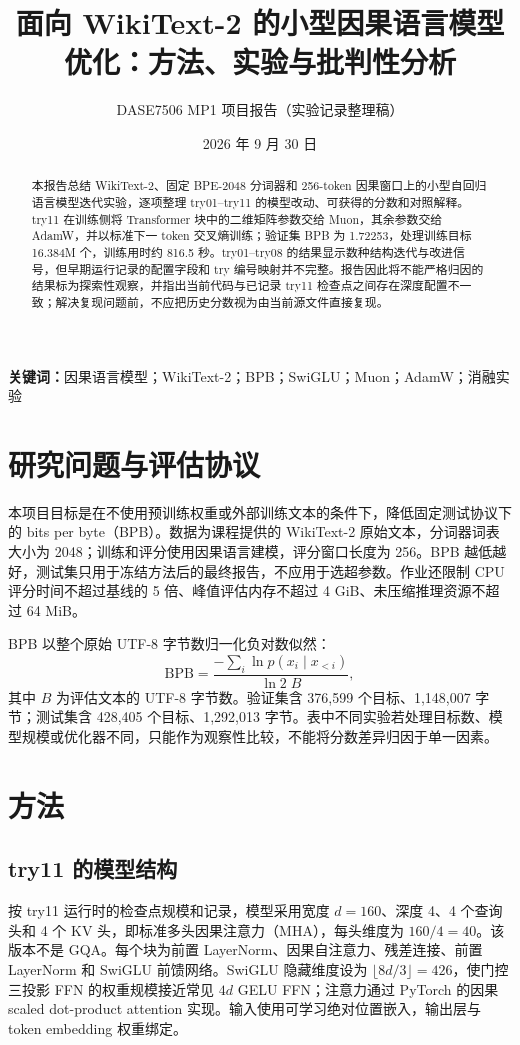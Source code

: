 \documentclass[UTF8,a4paper,11pt]{ctexart}
\title{面向 WikiText-2 的小型因果语言模型优化：方法、实验与批判性分析}
\author{DASE7506 MP1 项目报告（实验记录整理稿）}
\date{2026 年 9 月 30 日}
\begin{document}
\maketitle

\begin{abstract}
本报告总结 WikiText-2、固定 BPE-2048 分词器和 256-token 因果窗口上的小型自回归语言模型迭代实验，逐项整理 try01--try11 的模型改动、可获得的分数和对照解释。try11 在训练侧将 Transformer 块中的二维矩阵参数交给 Muon，其余参数交给 AdamW，并以标准下一 token 交叉熵训练；验证集 BPB 为 1.72253，处理训练目标 16.384M 个，训练用时约 816.5 秒。try01--try08 的结果显示数种结构迭代与改进信号，但早期运行记录的配置字段和 try 编号映射并不完整。报告因此将不能严格归因的结果标为探索性观察，并指出当前代码与已记录 try11 检查点之间存在深度配置不一致；解决复现问题前，不应把历史分数视为由当前源文件直接复现。
\end{abstract}

\noindent\textbf{关键词：}因果语言模型；WikiText-2；BPB；SwiGLU；Muon；AdamW；消融实验

\section{研究问题与评估协议}
本项目目标是在不使用预训练权重或外部训练文本的条件下，降低固定测试协议下的 bits per byte（BPB）。数据为课程提供的 WikiText-2 原始文本，分词器词表大小为 2048；训练和评分使用因果语言建模，评分窗口长度为 256。BPB 越低越好，测试集只用于冻结方法后的最终报告，不应用于选超参数。作业还限制 CPU 评分时间不超过基线的 5 倍、峰值评估内存不超过 4 GiB、未压缩推理资源不超过 64 MiB。

BPB 以整个原始 UTF-8 字节数归一化负对数似然：
\[
  \mathrm{BPB}=\frac{-\sum_i \ln p(x_i\mid x_{<i})}{\ln 2\; B},
\]
其中 $B$ 为评估文本的 UTF-8 字节数。验证集含 376,599 个目标、1,148,007 字节；测试集含 428,405 个目标、1,292,013 字节。表中不同实验若处理目标数、模型规模或优化器不同，只能作为观察性比较，不能将分数差异归因于单一因素。

\section{方法}
\subsection{try11 的模型结构}
按 try11 运行时的检查点规模和记录，模型采用宽度 $d=160$、深度 4、4 个查询头和 4 个 KV 头，即标准多头因果注意力（MHA），每头维度为 $160/4=40$。该版本不是 GQA。每个块为前置 LayerNorm、因果自注意力、残差连接、前置 LayerNorm 和 SwiGLU 前馈网络。SwiGLU 隐藏维度设为 $\lfloor 8d/3\rfloor=426$，使门控三投影 FFN 的权重规模接近常见 $4d$ GELU FFN；注意力通过 PyTorch 的因果 scaled dot-product attention 实现。输入使用可学习绝对位置嵌入，输出层与 token embedding 权重绑定。
\end{document}
